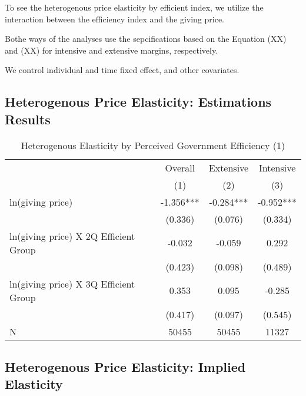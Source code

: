 \documentclass[ review  , 3p ]{elsarticle}
\begin{document}
  To see the heterogenous price elasticity by efficient index,
  we utilize the interaction between the efficiency index and the giving price.

  Bothe ways of the analyses use the sepcifications based on the Equation (XX) and (XX) for intensive and extensive margins,
  respectively.

  We control individual and time fixed effect,
  and other covariates.

  \hypertarget{heterogenous-price-elasticity-estimations-results}{%
  \subsection{Heterogenous Price Elasticity: Estimations Results}\label{heterogenous-price-elasticity-estimations-results}}

  \begin{table}

  \caption{\label{tab:kableHeteroElasticitySlide1}Heterogenous Elasticity by Perceived Government Efficiency (1)}
  \centering
  \fontsize{8}{10}\selectfont
  \begin{tabular}[t]{lccc}
  \toprule
  \multicolumn{1}{c}{ } & \multicolumn{1}{c}{Overall} & \multicolumn{1}{c}{Extensive} & \multicolumn{1}{c}{Intensive} \\
  \cmidrule(l{3pt}r{3pt}){2-2} \cmidrule(l{3pt}r{3pt}){3-3} \cmidrule(l{3pt}r{3pt}){4-4}
   & (1) & (2) & (3)\\
  \midrule
  ln(giving price) & -1.356*** & -0.284*** & -0.952***\\
   & (0.336) & (0.076) & (0.334)\\
  ln(giving price) X 2Q Efficient Group & -0.032 & -0.059 & 0.292\\
   & (0.423) & (0.098) & (0.489)\\
  ln(giving price) X 3Q Efficient Group & 0.353 & 0.095 & -0.285\\
   & (0.417) & (0.097) & (0.545)\\
  N & 50455 & 50455 & 11327\\
  \bottomrule
  \end{tabular}
  \end{table}

  \hypertarget{heterogenous-price-elasticity-implied-elasticity}{%
  \subsection{Heterogenous Price Elasticity: Implied Elasticity}\label{heterogenous-price-elasticity-implied-elasticity}}
\end{document}
